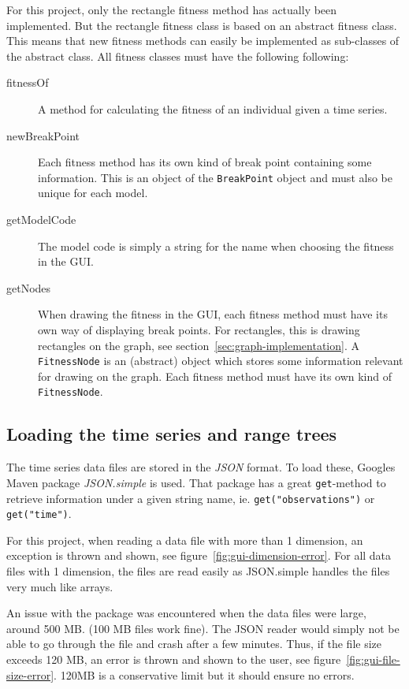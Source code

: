 For this project, only the rectangle fitness method has actually been
implemented. But the rectangle fitness class is based on an abstract fitness
class. This means that new fitness methods can easily be implemented as
sub-classes of the abstract class. All fitness classes must have the following
following: 
\begin{description}
    \item[fitnessOf] A method for calculating the fitness of an individual given
    a time series. 
    \item[newBreakPoint] Each fitness method has its own kind of break point
    containing some information. This is an object of the \texttt{BreakPoint}
    object and must also be unique for each model. 
    \item[getModelCode] The model code is simply a string for the name when
    choosing the fitness in the GUI. 
    \item[getNodes] When drawing the fitness in the GUI, each fitness method
    must have its own way of displaying break points. For rectangles, this is
    drawing rectangles on the graph, see section~\ref{sec:graph-implementation}.
    A \texttt{FitnessNode} is an (abstract) object which stores some information
    relevant for drawing on the graph. Each fitness method must have its own
    kind of \texttt{FitnessNode}. 
\end{description}


\subsection{Loading the time series and range trees} \label{sec:loading-time-series}

The time series data files are stored in the \textit{JSON} format. To load
these, Googles Maven package \textit{JSON.simple} is used. That package has a
great \texttt{get}-method to retrieve information under a given string name, ie.
\texttt{get("observations")} or \texttt{get("time")}. 

For this project, when reading a data file with more than 1 dimension, an
exception is thrown and shown, see figure~\ref{fig:gui-dimension-error}.
For all data files with 1 dimension, the files are read
easily as JSON.simple handles the files very much like arrays. 

An issue with the package was encountered when the data files were large, around
500 MB. (100 MB files work fine). The JSON reader would simply not be able to go
through the file and crash after a few minutes. Thus, if the file size exceeds
120 MB, an error is thrown and shown to the user,
see figure~\ref{fig:gui-file-size-error}. 120MB is a conservative limit but
it should ensure no errors. 

